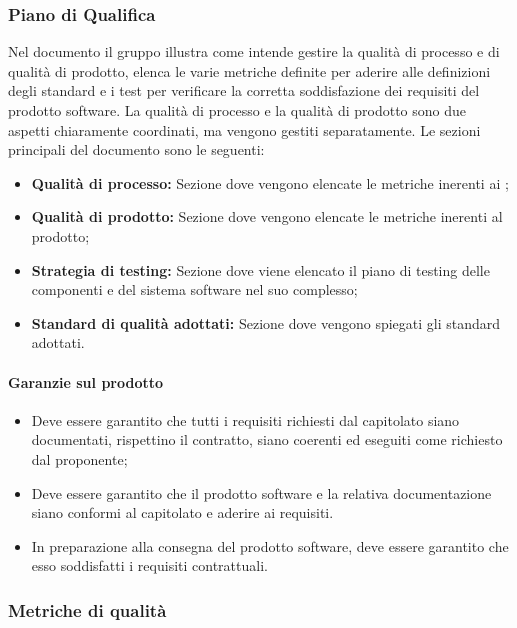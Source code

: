 \subsubsection{Piano di Qualifica}
Nel documento \PdQ{} il gruppo \Gruppo{} illustra come intende gestire la qualità di processo e di qualità di prodotto, elenca le varie metriche definite per aderire alle definizioni degli standard e i test per verificare la corretta soddisfazione dei requisiti del prodotto software.\newline
La qualità di processo e la qualità di prodotto sono due aspetti chiaramente coordinati, ma vengono gestiti separatamente.
Le sezioni principali del documento sono le seguenti:
\begin{itemize}
    \item \textbf{Qualità di processo:} Sezione dove vengono elencate le metriche inerenti ai ;
    \item \textbf{Qualità di prodotto:} Sezione dove vengono elencate le metriche inerenti al prodotto;
    \item \textbf{Strategia di testing:} Sezione dove viene elencato il piano di testing delle componenti e del sistema software nel suo complesso;
    \item \textbf{Standard di qualità adottati:} Sezione dove vengono spiegati gli standard adottati.
\end{itemize}
\paragraph{Garanzie sul prodotto}
\begin{itemize}
    \item Deve essere garantito che tutti i requisiti richiesti dal capitolato siano documentati, rispettino il contratto, siano coerenti ed eseguiti come richiesto dal proponente;
    \item Deve essere garantito che il prodotto software e la relativa documentazione siano conformi al capitolato e aderire ai requisiti.
    \item In preparazione alla consegna del prodotto software, deve essere garantito che esso soddisfatti i requisiti contrattuali.
\end{itemize}
\subsubsection{Metriche di qualità}
